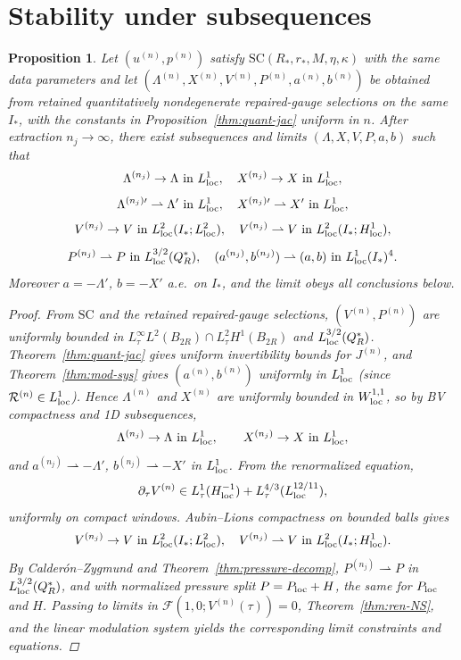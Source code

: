 \documentclass[11pt]{amsart}
\theoremstyle{plain}
\newtheorem{proposition}[theorem]{Proposition}
\theoremstyle{definition}
\theoremstyle{remark}
\begin{document}
\section{Stability under subsequences}\label{sec:stability}
\begin{proposition}\label{prop:stability}
Let \((u^{(n)},p^{(n)})\) satisfy \(\mathrm{SC}(R_*,r_*,M,\eta,\kappa)\) with the same
data parameters and let \((\Lambda^{(n)},X^{(n)},V^{(n)},P^{(n)},a^{(n)},b^{(n)})\)
be obtained from retained quantitatively nondegenerate repaired-gauge selections on the same \(I_*\),
with the constants in Proposition~\ref{thm:quant-jac} uniform in \(n\). After extraction \(n_j\to\infty\), there exist
subsequences and limits \((\Lambda,X,V,P,a,b)\) such that
\[
\Lambda^{(n_j)}\to\Lambda\ \text{in }L^1_{\rm loc},\quad
X^{(n_j)}\to X\ \text{in }L^1_{\rm loc},
\]
\[
\Lambda^{(n_j)\prime}\rightharpoonup\Lambda'\ \text{in }L^1_{\rm loc},\quad
X^{(n_j)\prime}\rightharpoonup X'\ \text{in }L^1_{\rm loc},
\]
\[
V^{(n_j)}\to V\ \text{in }L^2_{\rm loc}(I_*;L^2_{\rm loc}),\quad
V^{(n_j)}\rightharpoonup V\ \text{in }L^2_{\rm loc}(I_*;H^1_{\rm loc}),
\]
    \[
    P^{(n_j)}\rightharpoonup P\ \text{in }L^{3/2}_{\rm loc}(Q_R^*),\quad
    (a^{(n_j)},b^{(n_j)})\rightharpoonup(a,b)\ \text{in }L^1_{\rm loc}(I_*)^4.
    \]
    Moreover \(a=-\Lambda'\), \(b=-X'\) a.e.\ on \(I_*\), and the limit obeys all conclusions below.
\begin{proof}
From \(\mathrm{SC}\) and the retained repaired-gauge selections, \((V^{(n)},P^{(n)})\) are uniformly bounded in
\(L^\infty_\tau L^2(B_{2R})\cap L^2_\tau H^1(B_{2R})\) and \(L^{3/2}_{\rm loc}(Q_R^*)\).
Theorem~\ref{thm:quant-jac} gives uniform invertibility bounds for \(J^{(n)}\), and
Theorem~\ref{thm:mod-sys} gives \((a^{(n)},b^{(n)})\) uniformly in \(L^1_{\rm loc}\) (since
\(\mathcal R^{(n)}\in L^1_{\rm loc}\)). Hence \(\Lambda^{(n)}\) and \(X^{(n)}\) are uniformly
bounded in \(W^{1,1}_{\rm loc}\), so by BV compactness and 1D subsequences,
\[
\Lambda^{(n_j)}\to\Lambda\ \text{in }L^1_{\rm loc},\qquad
X^{(n_j)}\to X\ \text{in }L^1_{\rm loc},
\]
and \(a^{(n_j)}\rightharpoonup -\Lambda'\), \(b^{(n_j)}\rightharpoonup -X'\) in \(L^1_{\rm loc}\).
From the renormalized equation,
\[
\partial_\tau V^{(n)}\in
L^1_\tau(H^{-1}_{\rm loc})+L^{4/3}_\tau(L^{12/11}_{\rm loc}),
\]
uniformly on compact windows. Aubin--Lions compactness on bounded balls gives
\[
V^{(n_j)}\to V\ \text{in }L^2_{\rm loc}(I_*;L^2_{\rm loc}),\quad
V^{(n_j)}\rightharpoonup V\ \text{in }L^2_{\rm loc}(I_*;H^1_{\rm loc}).
\]
By Calderón--Zygmund and Theorem~\ref{thm:pressure-decomp}, \(P^{(n_j)}\rightharpoonup P\) in
\(L^{3/2}_{\rm loc}(Q_R^*)\), and with normalized pressure split \(P=P_{\rm loc}+H\),
the same for \(P_{\rm loc}\) and \(H\). Passing to limits in
\(\mathcal F(1,0;V^{(n)}(\tau))=0\), Theorem~\ref{thm:ren-NS}, and the linear modulation system
yields the corresponding limit constraints and equations.

\end{proof}
\end{proposition}
\end{document}
